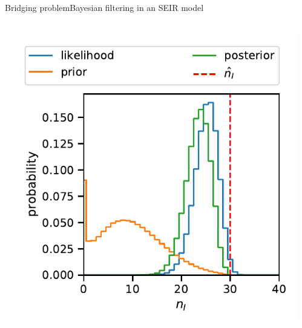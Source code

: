 \documentclass[9pt]{beamer}
\begin{document}
\begin{frame}{Bridging problem}{Bayesian filtering in an SEIR model}
\begin{columns}
\begin{column}{.35\paperwidth}
            \includegraphics[width=\textwidth]{../gfx/posterior.pdf}
        \end{column}
        \begin{column}{.25\paperwidth}

\end{column}
\end{columns}
\end{frame}
\end{document}
